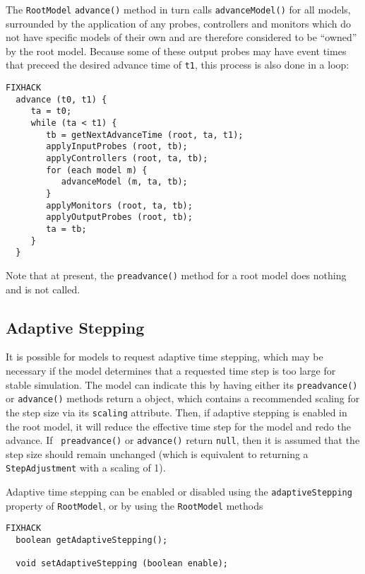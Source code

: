 \documentclass{article}
\begin{document}
The {\tt RootModel} {\tt advance()} method in turn calls {\tt advanceModel()}
for all models, surrounded by the application of any
probes, controllers and monitors which do not have specific models of
their own and are therefore considered to be ``owned'' by the root
model. Because some of these output probes may have event
times that preceed the desired advance time of {\tt t1}, this process
is also done in a loop:
\begin{lstlisting}FIXHACK
  advance (t0, t1) {
     ta = t0;
     while (ta < t1) {
        tb = getNextAdvanceTime (root, ta, t1);
        applyInputProbes (root, tb);
        applyControllers (root, ta, tb);
        for (each model m) {
           advanceModel (m, ta, tb);
        }
        applyMonitors (root, ta, tb);
        applyOutputProbes (root, tb);
        ta = tb;
     }
  }
\end{lstlisting}

Note that at present, the {\tt preadvance()} method for a root model
does nothing and is not called.


\subsection{Adaptive Stepping}
\label{AdaptiveSteppingSec}

It is possible for models to request adaptive time stepping, which may
be necessary if the model determines that a requested time step is too
large for stable simulation. The model can indicate this by having
either its {\tt preadvance()} or {\tt advance()} methods return a
 object, which contains a recommended
scaling for the step size via its {\tt scaling} attribute.  Then, if
adaptive stepping is enabled in the root model, it will reduce the
effective time step for the model and redo the advance.  If {\tt
preadvance()} or {\tt advance()} return {\tt null}, then it is assumed
that the step size should remain unchanged (which is equivalent to
returning a {\tt StepAdjustment} with a scaling of 1).

Adaptive time stepping can be enabled or disabled using the {\tt adaptiveStepping}
property of {\tt RootModel}, or by using the {\tt RootModel} methods
\begin{lstlisting}FIXHACK
  boolean getAdaptiveStepping();

  void setAdaptiveStepping (boolean enable);
\end{lstlisting}
\end{document}
